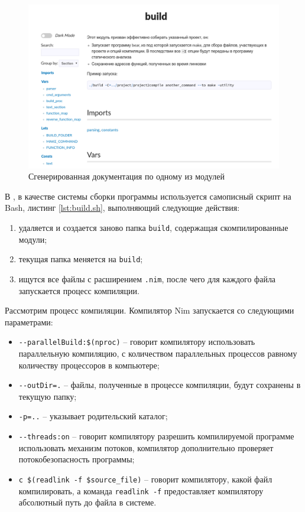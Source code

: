 \begin{figure}[!hbtp]
    \includegraphics[width=\textwidth,height=\textheight,keepaspectratio]{images/nim_doc_gen.png}
    \caption{Сгенерированная документация по одному из модулей {\ProgModule}\label{fig:nim-doc-gen}}
\end{figure}

В {\ProgModule}, в качестве системы сборки программы используется самописный скрипт на Bash, 
листинг \autoref{lst:build.sh}, выполняющий следующие действия:
\begin{enumerate}[label={\arabic*)}]
    \item удаляется и создается заново папка \verb|build|, содержащая скомпилированные модули;
    \item текущая папка меняется на \verb|build|;
    \item ищутся все файлы с расширением \verb|.nim|, после чего для каждого файла
        запускается процесс компиляции.
\end{enumerate}

Рассмотрим процесс компиляции. Компилятор Nim запускается со следующими параметрами:
\begin{itemize}
    \item \verb|--parallelBuild:$(nproc)| -- говорит компилятору 
        использовать параллельную компиляцию, с количеством параллельных процессов равному
        количеству процессоров в компьютере;
    \item \verb|--outDir=.| -- файлы, полученные в процессе компиляции, будут сохранены в 
        текущую папку;
    \item \verb|-p=..| -- указывает родительский каталог;
    \item \verb|--threads:on| -- говорит компилятору разрешить компилируемой программе использовать
        механизм потоков, компилятор дополнительно проверяет потокобезопасность программы;
    \item \verb|с $(readlink -f $source_file)| -- говорит компилятору, какой файл компилировать,
        а команда \verb|readlink -f| предоставляет компилятору абсолютный путь до файла в системе.
\end{itemize}

